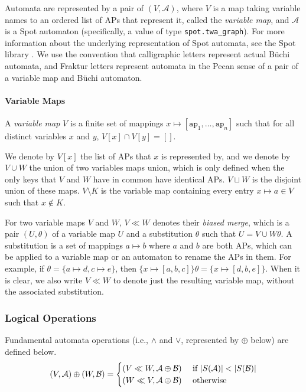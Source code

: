 Automata are represented by a pair of $(V, \mathcal{A})$, where $V$ is a map taking variable names to an ordered list of APs that represent it, called the \emph{variable map}, and $\mathcal{A}$ is a Spot automaton (specifically, a value of type \texttt{spot.twa\_graph}).
For more information about the underlying representation of Spot automata, see the Spot library \cite{duret.16.atva2}.
We use the convention that calligraphic letters represent actual B\"uchi automata, and Fraktur letters represent automata in the Pecan sense of a pair of a variable map and B\"uchi automaton.

\paragraph{Variable Maps}
A \emph{variable map} $V$ is a finite set of mappings $x \mapsto [\texttt{ap}_1, \ldots, \texttt{ap}_n]$ such that for all distinct variables $x$ and $y$, $V[x] \cap V[y] = []$.

We denote by $V[x]$ the list of APs that $x$ is represented by, and we denote by $V \cup W$ the union of two variables maps union, which is only defined when the only keys that $V$ and $W$ have in common have identical APs.
$V \sqcup W$ is the disjoint union of these maps.
$V \setminus K$ is the variable map containing every entry $x \mapsto a \in V$ such that $x \not\in K$.

For two variable maps $V$ and $W$, $V \ll W$ denotes their \emph{biased merge}, which is a pair $(U, \theta)$ of a variable map $U$ and a substitution $\theta$ such that $U = V \cup W\theta$.
A substitution is a set of mappings $a \mapsto b$ where $a$ and $b$ are both APs, which can be applied to a variable map or an automaton to rename the APs in them.
For example, if $\theta = \{ a \mapsto d, c \mapsto e \}$, then $\{ x \mapsto [ a, b, c ] \} \theta = \{ x \mapsto [ d, b, e ] \}$.
When it is clear, we also write $V \ll W$ to denote just the resulting variable map, without the associated substitution.

\subsubsection{Logical Operations}

Fundamental automata operations (i.e., $\land$ and $\lor$, represented by $\oplus$ below) are defined below.
\[
    (V, \mathcal{A}) \oplus (W, \mathcal{B}) = 
    \begin{cases}
        (V \ll W, \mathcal{A} \oplus \mathcal{B}) & ~\text{if}~ |S(\mathcal{A})| < |S(\mathcal{B})| \\
        (W \ll V, \mathcal{A} \oplus \mathcal{B}) & ~\text{otherwise}~
    \end{cases}
\]

